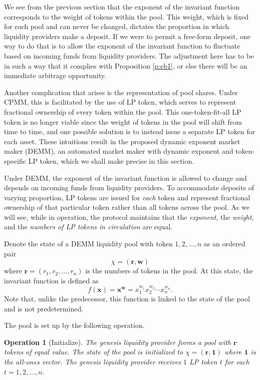 \documentclass[12pt,a4paper]{article}
\newtheorem{operation}[corollary]{Operation}
\begin{document}
We see from the previous section that the exponent of the invariant function corresponds to the weight of tokens within the pool. This weight, which is fixed for each pool and can never be changed, dictates the proportion in which liquidity providers make a deposit. If we were to permit a free-form deposit, one way to do that is to allow the exponent of the invariant function to fluctuate based on incoming funds from liquidity providers. The adjustment here has to be in such a way that it complies with Proposition \ref{p:eb1}, or else there will be an immediate arbitrage opportunity.

Another complication that arises is the representation of pool shares. Under CPMM, this is facilitated by the use of LP token, which serves to represent fractional ownership of every token within the pool. This one-token-fit-all LP token is no longer viable since the weight of tokens in the pool will shift from time to time, and one possible solution is to instead issue a separate LP token for each asset. These intuitions result in the proposed dynamic exponent market maker (DEMM), an automated market maker with dynamic exponent and token-specific LP token, which we shall make precise in this section.

Under DEMM, the exponent of the invariant function is allowed to change and depends on incoming funds from liquidity providers. To accommodate deposits of varying proportion, LP tokens are issued for \emph{each} token and represent fractional ownership of that particular token rather than all tokens across the pool. As we will see, while in operation, the protocol maintains that the \emph{exponent}, the \emph{weight}, and the \emph{numbers of LP tokens in circulation} are equal.

Denote the state of a DEMM liquidity pool with token $1,2,\ldots,n$ as an ordered pair
\[\chi=(\mathbf{r},\mathbf{w})\]
where $\mathbf{r}=(r_1,r_2,\ldots,r_n)$ is the numbers of tokens in the pool. At this state, the invariant function is defined as
\[f(\mathbf{x})=\mathbf{x}^\mathbf{w}=x_1^{w_1}x_2^{w_2}\cdots x_n^{w_n}.\]
Note that, unlike the predecessor, this function is linked to the state of the pool and is not predetermined.

The pool is set up by the following operation.

\begin{operation}[Initialize]\label{o:initialize2}
The genesis liquidity provider forms a pool with $\mathbf{r}$ tokens of equal value. The state of the pool is initialized to $\chi=(\mathbf{r},\mathbf{1})$ where $\mathbf{1}$ is the all-ones vector. The genesis liquidity provider receives $1$ LP token $t$ for each $t=1,2,\ldots,n$.
\end{operation}
\end{document}
